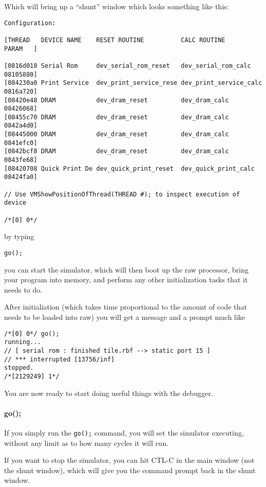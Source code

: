 Which will bring up a ``shunt'' window which looks something like this:

\begin{verbatim}
Configuration: 

[THREAD   DEVICE NAME    RESET ROUTINE          CALC ROUTINE           PARAM   ]

[0816d010 Serial Rom     dev_serial_rom_reset   dev_serial_rom_calc    08105880]
[084230a0 Print Service  dev_print_service_rese dev_print_service_calc 0816a720]
[08420e48 DRAM           dev_dram_reset         dev_dram_calc          08426068]
[08455c70 DRAM           dev_dram_reset         dev_dram_calc          0842a4d0]
[08445000 DRAM           dev_dram_reset         dev_dram_calc          0841efc0]
[0842bcf8 DRAM           dev_dram_reset         dev_dram_calc          0843fe68]
[08420708 Quick Print De dev_quick_print_reset  dev_quick_print_calc   08424fa0]

// Use VMShowPositionOfThread(THREAD #); to inspect execution of device 

/*[0] 0*/ 
\end{verbatim}

by typing 

\begin{verbatim}go();\end{verbatim}

you can start the simulator, which will then boot up the raw processor,  
bring your program into memory, and perform any other initialization tasks 
that it needs to do.

After initialiation (which takes time proportional to the amount of code
that needs to be loaded into raw) you will get a message and a prompt much like

\begin{verbatim}
/*[0] 0*/ go();
running...
// [ serial rom : finished tile.rbf --> static port 15 ]
// *** interrupted [13756/inf]
stopped.
/*[2129249] 1*/ 
\end{verbatim}

You are now ready to start doing useful things with the debugger.

\paragraph{go();}
If you simply run the \texttt{go();} command, you will set the simulator executing, 
without any limit as to how many cycles it will run.

If you want to stop the simulator, you can hit CTL-C in the main window (not the
shunt window), which will give you the command prompt back in the shunt window.

